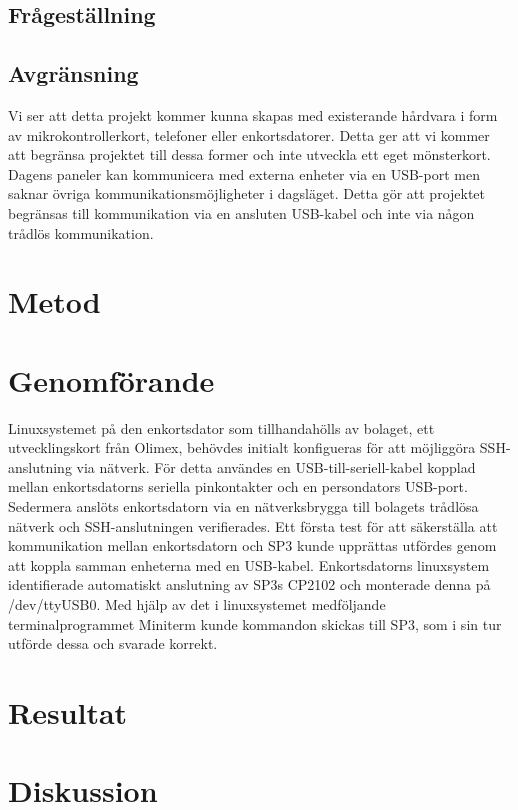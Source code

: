 \documentclass{article}
\begin{document}
		\subsection{Frågeställning} %
		\label{sub:fragestallning}
		

		\subsection{Avgränsning} %
		\label{sub:avgransning}
			Vi ser att detta projekt kommer kunna skapas med existerande hårdvara i form av mikrokontrollerkort, telefoner eller enkortsdatorer. Detta ger att vi kommer att begränsa projektet till dessa former och inte utveckla ett eget mönsterkort.\\

			\noindent Dagens paneler kan kommunicera med externa enheter via en USB-port men saknar övriga kommunikationsmöjligheter i dagsläget. Detta gör att projektet begränsas till kommunikation via en ansluten USB-kabel och inte via någon trådlös kommunikation.

	\section{Metod} %
	\label{sec:huvudtext}

	\section{Genomförande} %
	\label{sec:genomf_rande}
		Linuxsystemet på den enkortsdator som tillhandahölls av bolaget, ett utvecklingskort från Olimex, behövdes initialt konfigueras för att möjliggöra SSH-anslutning via nätverk. För detta användes en USB-till-seriell-kabel kopplad mellan enkortsdatorns seriella pinkontakter och en persondators USB-port. Sedermera anslöts enkortsdatorn via en nätverksbrygga till bolagets trådlösa nätverk och SSH-anslutningen verifierades. Ett första test för att säkerställa att kommunikation mellan enkortsdatorn och SP3 kunde upprättas utfördes genom att koppla samman enheterna med en USB-kabel. Enkortsdatorns linuxsystem identifierade automatiskt anslutning av SP3s CP2102 och monterade denna på /dev/ttyUSB0. Med hjälp av det i linuxsystemet medföljande terminalprogrammet Miniterm kunde kommandon skickas till SP3, som i sin tur utförde dessa och svarade korrekt.

	\section{Resultat} %
	\label{sec:resultat}


	\section{Diskussion} %
	\label{sec:sammanfattning}


	\printbibliography		
\end{document}
